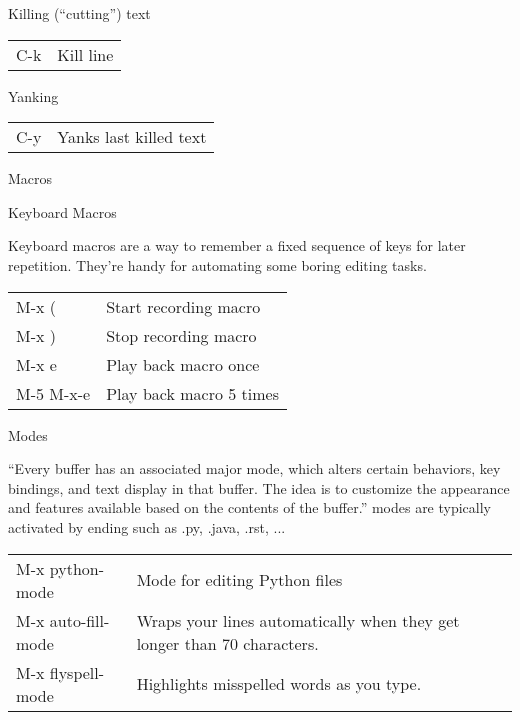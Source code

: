 Killing (``cutting'') text

\noindent\begin{tabulary}{\linewidth}{|L|L|}
\hline
{}\relax &\relax \\
\hline
C-k
&
Kill line
\\
\hline\end{tabulary}


Yanking

\noindent\begin{tabulary}{\linewidth}{|L|L|}
\hline
{}\relax &\relax \\
\hline
C-y
&
Yanks last killed text
\\
\hline\end{tabulary}


Macros

Keyboard Macros

Keyboard macros are a way to remember a fixed sequence of keys for later repetition. They're handy for automating some boring editing tasks.

\noindent\begin{tabulary}{\linewidth}{|L|L|}
\hline
{}\relax &\relax \\
\hline
M-x (
&
Start recording macro
\\
\hline
M-x )
&
Stop recording macro
\\
\hline
M-x e
&
Play back macro once
\\
\hline
M-5 M-x-e
&
Play back macro 5 times
\\
\hline\end{tabulary}


Modes

``Every buffer has an associated major mode, which alters certain behaviors, key bindings, and text display in that buffer. The idea is to customize the appearance and features available based on the contents of the buffer.''
modes are typically activated by ending such as .py, .java, .rst, ...

\noindent\begin{tabulary}{\linewidth}{|L|L|}
\hline
{}\relax &\relax \\
\hline
M-x python-mode
&
Mode for editing Python files
\\
\hline
M-x auto-fill-mode
&
Wraps your lines automatically when they get longer than 70 characters.
\\
\hline
M-x flyspell-mode
&
Highlights misspelled words as you type.
\\
\hline\end{tabulary}



